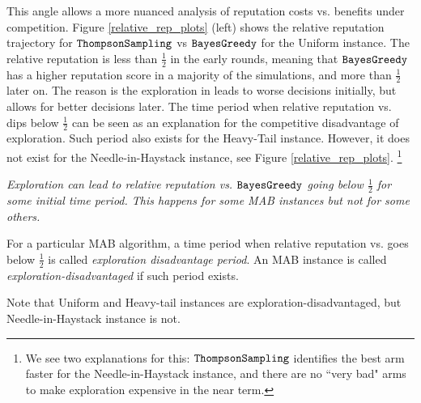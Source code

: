 \documentclass[../competing_bandits.tex]{subfiles}
\begin{document}
This angle allows a more nuanced analysis of reputation costs vs. benefits under competition. Figure \ref{relative_rep_plots} (left) shows the relative reputation trajectory for $\mathtt{ThompsonSampling}$ vs $\mathtt{BayesGreedy}$ for the Uniform instance. The relative reputation is less than $\tfrac12$ in the early rounds, meaning that $\mathtt{BayesGreedy}$ has a higher reputation score in a majority of the simulations, and more than $\tfrac12$ later on. The reason is the exploration in \Thompson leads to worse decisions initially, but allows for better decisions later. The time period when relative reputation vs. \DynamicGreedy dips below $\tfrac12$ can be seen as an explanation for the competitive disadvantage of exploration. Such period also exists for the Heavy-Tail instance. However, it does not exist for the Needle-in-Haystack instance, see Figure \ref{relative_rep_plots}.%
\footnote{We see two explanations for this: $\mathtt{ThompsonSampling}$ identifies the best arm faster for the Needle-in-Haystack instance, and there are no ``very bad" arms to make exploration expensive in the near term.}


\begin{finding}\label{find:period}
\textit{Exploration can lead to relative reputation vs. $\mathtt{BayesGreedy}$ going below $\tfrac12$ for some initial time period. This happens for some MAB instances but not for some others.}
\end{finding}

\begin{definition}
For a particular MAB algorithm, a time period when relative reputation vs. \DynamicGreedy goes below $\tfrac12$ is called {\em exploration disadvantage period}. An MAB instance is called \emph{exploration-disadvantaged} if such period exists.
\end{definition}

\noindent Note that Uniform and Heavy-tail instances are exploration-disadvantaged, but Needle-in-Haystack instance is not.
\end{document}
